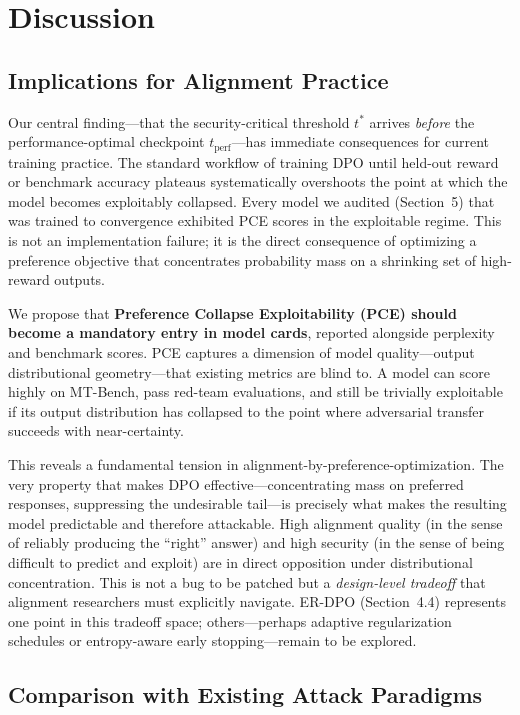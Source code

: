 \section{Discussion}
\label{sec:discussion}

\subsection{Implications for Alignment Practice}

Our central finding---that the security-critical threshold $t^*$ arrives \emph{before} the performance-optimal checkpoint $t_{\text{perf}}$---has immediate consequences for current training practice. The standard workflow of training DPO until held-out reward or benchmark accuracy plateaus systematically overshoots the point at which the model becomes exploitably collapsed. Every model we audited (Section~5) that was trained to convergence exhibited PCE scores in the exploitable regime. This is not an implementation failure; it is the direct consequence of optimizing a preference objective that concentrates probability mass on a shrinking set of high-reward outputs.

We propose that \textbf{Preference Collapse Exploitability (PCE) should become a mandatory entry in model cards}, reported alongside perplexity and benchmark scores. PCE captures a dimension of model quality---output distributional geometry---that existing metrics are blind to. A model can score highly on MT-Bench, pass red-team evaluations, and still be trivially exploitable if its output distribution has collapsed to the point where adversarial transfer succeeds with near-certainty.

This reveals a fundamental tension in alignment-by-preference-optimization. The very property that makes DPO effective---concentrating mass on preferred responses, suppressing the undesirable tail---is precisely what makes the resulting model predictable and therefore attackable. High alignment quality (in the sense of reliably producing the ``right'' answer) and high security (in the sense of being difficult to predict and exploit) are in direct opposition under distributional concentration. This is not a bug to be patched but a \emph{design-level tradeoff} that alignment researchers must explicitly navigate. ER-DPO (Section~4.4) represents one point in this tradeoff space; others---perhaps adaptive regularization schedules or entropy-aware early stopping---remain to be explored.

\subsection{Comparison with Existing Attack Paradigms}

